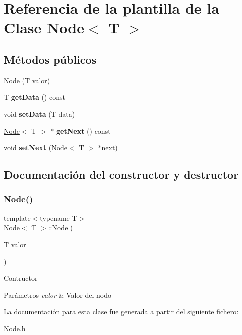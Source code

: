 \hypertarget{classNode}{}\section{Referencia de la plantilla de la Clase Node$<$ T $>$}
\label{classNode}
\subsection*{Métodos públicos}
\begin{DoxyCompactItemize}
\item 
\hyperlink{classNode_a25d6a5ffc8af76558c7af41c062fca54}{Node} (T valor)
\item 
\mbox{\label{classNode_a8094d013d4cefc80653853c4a5c45a7a}} 
T {\bfseries get\+Data} () const
\item 
\mbox{\label{classNode_a3955130f36c0a6d39641dee186caf2a3}} 
void {\bfseries set\+Data} (T data)
\item 
\mbox{\label{classNode_a8893f2508a2bc5060ec69e04d13f4613}} 
\hyperlink{classNode}{Node}$<$ T $>$ $\ast$ {\bfseries get\+Next} () const
\item 
\mbox{\label{classNode_a486348d99412bba1c889db7dd63ca8cb}} 
void {\bfseries set\+Next} (\hyperlink{classNode}{Node}$<$ T $>$ $\ast$next)
\end{DoxyCompactItemize}


\subsection{Documentación del constructor y destructor}
\mbox{\label{classNode_a25d6a5ffc8af76558c7af41c062fca54}} 
\subsubsection{\texorpdfstring{Node()}{Node()}}
{\footnotesize\ttfamily template$<$typename T$>$ \\
\hyperlink{classNode}{Node}$<$ T $>$\+::\hyperlink{classNode}{Node} (\begin{DoxyParamCaption}\item[{T}]{valor }\end{DoxyParamCaption})\hspace{0.3cm}{\ttfamily [inline]}}

Contructor 
\begin{DoxyParams}{Parámetros}
{\em valor} & Valor del nodo \\
\hline
\end{DoxyParams}


La documentación para esta clase fue generada a partir del siguiente fichero\+:\begin{DoxyCompactItemize}
\item 
Node.\+h\end{DoxyCompactItemize}
